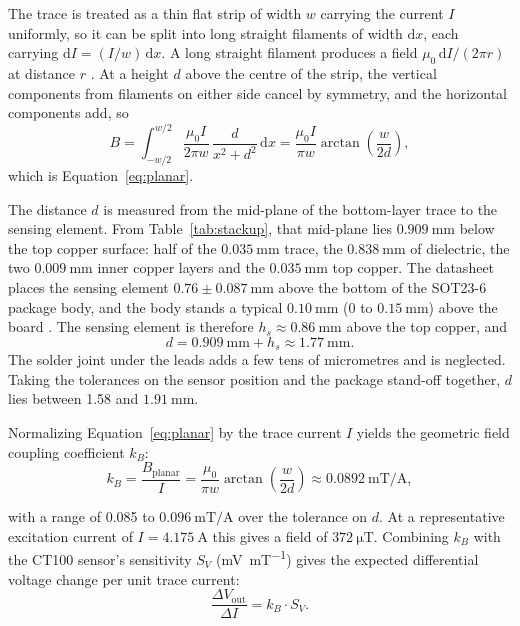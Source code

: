 \documentclass[12pt,a4paper]{article}
\begin{document}
The trace is treated as a thin flat strip of width $w$ carrying the current $I$ uniformly, so it can be split into long straight filaments of width $\mathrm{d}x$, each carrying $\mathrm{d}I = (I/w)\,\mathrm{d}x$. A long straight filament produces a field $\mu_0\,\mathrm{d}I/(2\pi r)$ at distance $r$ \cite{openstax_up2}. At a height $d$ above the centre of the strip, the vertical components from filaments on either side cancel by symmetry, and the horizontal components add, so
\begin{equation}
B = \int_{-w/2}^{w/2} \frac{\mu_0 I}{2\pi w}\,\frac{d}{x^2+d^2}\,\mathrm{d}x = \frac{\mu_0 I}{\pi w}\arctan\!\left(\frac{w}{2d}\right),
\end{equation}
which is Equation~\eqref{eq:planar}.

The distance $d$ is measured from the mid-plane of the bottom-layer trace to the sensing element. From Table~\ref{tab:stackup}, that mid-plane lies $\SI{0.909}{\milli\metre}$ below the top copper surface: half of the $\SI{0.035}{\milli\metre}$ trace, the $\SI{0.838}{\milli\metre}$ of dielectric, the two $\SI{0.009}{\milli\metre}$ inner copper layers and the $\SI{0.035}{\milli\metre}$ top copper. The datasheet places the sensing element $0.76 \pm \SI{0.087}{\milli\metre}$ above the bottom of the SOT23-6 package body, and the body stands a typical $\SI{0.10}{\milli\metre}$ (0 to $\SI{0.15}{\milli\metre}$) above the board \cite{ct100_datasheet}. The sensing element is therefore $h_s \approx \SI{0.86}{\milli\metre}$ above the top copper, and
\begin{equation}
d = \SI{0.909}{\milli\metre} + h_s \approx \SI{1.77}{\milli\metre}.
\label{eq:d-stackup}
\end{equation}
The solder joint under the leads adds a few tens of micrometres and is neglected. Taking the tolerances on the sensor position and the package stand-off together, $d$ lies between 1.58 and $\SI{1.91}{\milli\metre}$.

Normalizing Equation~\eqref{eq:planar} by the trace current $I$ yields the geometric field coupling coefficient $k_B$:
\begin{equation}
k_B = \frac{B_{\text{planar}}}{I} = \frac{\mu_0}{\pi w} \arctan\left( \frac{w}{2d} \right) \approx \SI{0.0892}{\milli\tesla\per\ampere},
\label{eq:field-coeff}
\end{equation}

with a range of 0.085 to $\SI{0.096}{\milli\tesla\per\ampere}$ over the tolerance on $d$. At a representative excitation current of $I = \SI{4.175}{\ampere}$ this gives a field of $\SI{372}{\micro\tesla}$. Combining $k_B$ with the CT100 sensor's sensitivity $S_V$ (\si{\milli\volt\per\milli\tesla}) gives the expected differential voltage change per unit trace current:
\begin{equation}
\frac{\Delta V_{\text{out}}}{\Delta I} = k_B \cdot S_V.
\label{eq:sensitivity-transfer}
\end{equation}
\end{document}
